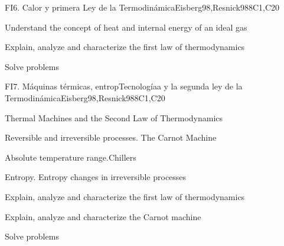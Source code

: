 \begin{syllabus}
\begin{unit}{FI6. Calor y primera Ley de la Termodinámica}{}{Eisberg98,Resnick98}{8}{C1,C20}
   \begin{learningoutcomes}
         \item  Understand the concept of heat and internal energy of an ideal gas
         \item  Explain, analyze and characterize the first law of thermodynamics
         \item  Solve problems
   \end{learningoutcomes}
\end{unit}

\begin{unit}{FI7. Máquinas térmicas, entropTecnologíaa y la segunda ley de la Termodinámica}{}{Eisberg98,Resnick98}{8}{C1,C20}
\begin{topics}
         \item  Thermal Machines and the Second Law of Thermodynamics
	 \item  Reversible and irreversible processes. The Carnot Machine
         \item  Absolute temperature range.Chillers 
	 \item  Entropy. Entropy changes in irreversible processes
   \end{topics}

   \begin{learningoutcomes}
         \item  Explain, analyze and characterize the first law of thermodynamics
         \item  Explain, analyze and characterize the Carnot machine
         \item  Solve problems
   \end{learningoutcomes}
\end{unit}

\begin{coursebibliography}
\end{coursebibliography}

\end{syllabus}

%
